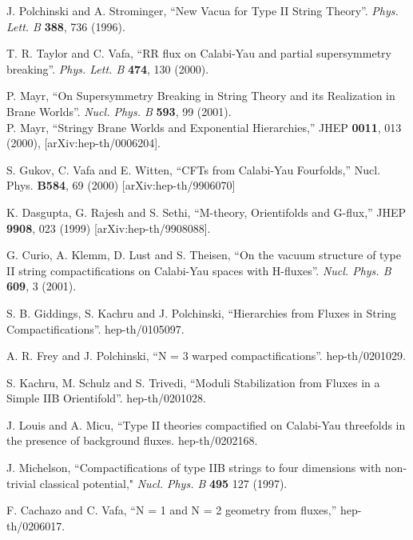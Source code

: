 \documentclass[a4paper,12pt]{article}
\begin{document}
\begin{thebibliography}{99}
J. Polchinski and A. Strominger, ``New Vacua for Type II String
Theory''. {\it Phys.  Lett.  B} {\bf 388}, 736 (1996).



T. R. Taylor and C. Vafa, ``RR flux on Calabi-Yau and partial
supersymmetry breaking''. {\it Phys. Lett. B} {\bf 474}, 130
(2000).



P. Mayr, ``On Supersymmetry Breaking in String Theory and its
Realization in Brane Worlds''. {\it Nucl.  Phys.  B} {\bf 593}, 99
(2001).\\
P. Mayr, ``Stringy Brane Worlds and Exponential Hierarchies,''
JHEP {\bf 0011}, 013 (2000), [arXiv:hep-th/0006204].

S. Gukov, C. Vafa and E. Witten, ``CFTs from Calabi-Yau
Fourfolds,'' Nucl. Phys. {\bf B584}, 69 (2000)
[arXiv:hep-th/9906070]

K. Dasgupta, G. Rajesh and S. Sethi, ``M-theory, Orientifolds and
G-flux,'' JHEP {\bf 9908}, 023 (1999) [arXiv:hep-th/9908088].



G. Curio, A. Klemm, D. Lust and S. Theisen, ``On the vacuum
structure of type II string compactifications on  Calabi-Yau
spaces with H-fluxes''. {\it Nucl. Phys. B} {\bf 609}, 3 (2001).


 S. B. Giddings, S. Kachru and J. Polchinski,
``Hierarchies from Fluxes in String Compactifications''.
hep-th/0105097.


A. R. Frey and J. Polchinski, ``N = 3 warped compactifications''.
hep-th/0201029.



S. Kachru, M. Schulz and S. Trivedi,
 ``Moduli Stabilization from Fluxes in a Simple IIB Orientifold''.
 hep-th/0201028.



 J. Louis and A. Micu,
``Type II theories compactified on Calabi-Yau threefolds in the
presence of background fluxes. hep-th/0202168.



 J. Michelson,
``Compactifications of type IIB strings to four dimensions with
non-trivial classical potential,"  {\it Nucl.  Phys.  B } {\bf
495} 127 (1997).


 F. Cachazo and C.  Vafa,
``N = 1 and N = 2 geometry from fluxes,'' hep-th/0206017.



\end{thebibliography}
\end{document}
